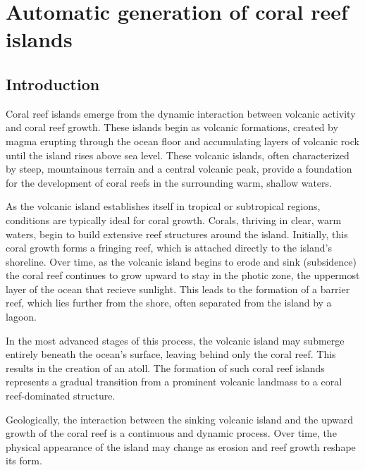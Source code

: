 


\chapter{Automatic generation of coral reef islands}
\label{chap:coral-island}
\minitoc

\section{Introduction}
\label{sec:coral-island_introduction}

Coral reef islands emerge from the dynamic interaction between volcanic activity and coral reef growth. These islands begin as volcanic formations, created by magma erupting through the ocean floor and accumulating layers of volcanic rock until the island rises above sea level. These volcanic islands, often characterized by steep, mountainous terrain and a central volcanic peak, provide a foundation for the development of coral reefs in the surrounding warm, shallow waters.

As the volcanic island establishes itself in tropical or subtropical regions, conditions are typically ideal for coral growth. Corals, thriving in clear, warm waters, begin to build extensive reef structures around the island. Initially, this coral growth forms a fringing reef, which is attached directly to the island's shoreline. Over time, as the volcanic island begins to erode and sink (subsidence) the coral reef continues to grow upward to stay in the photic zone, the uppermost layer of the ocean that recieve sunlight. This leads to the formation of a barrier reef, which lies further from the shore, often separated from the island by a lagoon.

In the most advanced stages of this process, the volcanic island may submerge entirely beneath the ocean's surface, leaving behind only the coral reef. This results in the creation of an atoll. The formation of such coral reef islands represents a gradual transition from a prominent volcanic landmass to a coral reef-dominated structure. 

Geologically, the interaction between the sinking volcanic island and the upward growth of the coral reef is a continuous and dynamic process. Over time, the physical appearance of the island may change as erosion and reef growth reshape its form.

